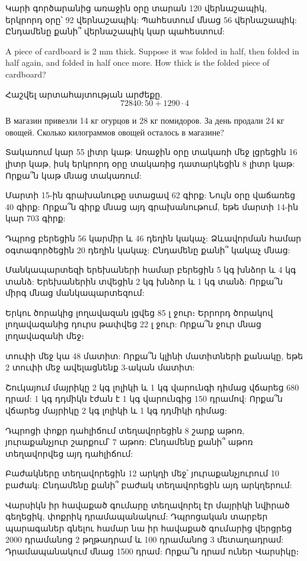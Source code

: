 






\problem 
Կարի գործարանից առաջին օրը տարան 120 վերնաշապիկ, 
երկրորդ օրը՝ 92 վերնաշապիկ: Պահեստում մնաց 56 
վերնաշապիկ: Ընդամենը քանի՞ վերնաշապիկ կար պահեստում:

\problem
A piece of cardboard is 2 mm thick. Suppose it was 
folded in half, then folded in half again, and folded 
in half once more. How thick is the folded piece of 
cardboard?

\problem
Հաշվել արտահայտության արժեքը. $$72840 : 50 + 1290\cdot 4$$

\problem
В магазин привезли 14 кг огурцов и 28 кг помидоров. За день 
продали 24 кг овощей. Сколько килограммов овощей  осталось 
в магазине?

\problem 
Տակառում կար 55 լիտր կաթ: Առաջին օրը տակառի մեջ 
լցրեցին 16 լիտր կաթ, իսկ երկրորդ օրը տակառից 
դատարկեցին 8 լիտր կաթ: Որքա՞ն կաթ մնաց տակառում:

\problem
Մարտի 15-ին գրախանութը ստացավ 62 գիրք: Նույն օրը 
վաճառեց 40 գիրք: Որքա՞ն գիրք մնաց այդ գրախանութում, 
եթե մարտի 14-ին կար 703 գիրք:

\problem 
Դպրոց բերեցին 56 կարմիր և 46 դեղին կակաչ: Ձևավորման 
համար օգտագործեցին 20 դեղին կակաչ: Ընդամենը քանի՞ 
կակաչ մնաց:

\problem
Մանկապարտեզի երեխաների համար բերե\-ցին 5 կգ խնձոր և 4 
կգ տանձ: Երեխաներին տվեցին 2 կգ խնձոր և 1 կգ տանձ: 
Որքա՞ն միրգ մնաց մանկապարտեզում:

\problem 
Երկու ծորակից լողավազան լցվեց 85 լ ջուր։ Երրորդ ծորակով 
լողավազանից դուրս թափ\-վեց 22 լ ջուր: Որքա՞ն ջուր մնաց 
լողավա\-զանի մեջ։

 տուփի մեջ կա 48 մատիտ: Որքա՞ն կլինի մա\-տիտների 
քանակը, եթե 2 տուփի մեջ ավելաց\-նենք 3-ական մատիտ:

\problem 
Շուկայում մայրիկը 2 կգ լոլիկի և 1 կգ վարունգի դիմաց վճարեց 
680 դրամ: 1 կգ դդմիկն էժան է 1 կգ վարունգից 150 դրամով: 
Որքա՞ն վճարեց մայրիկը 2 կգ լոլիկի և 1 կգ դդմիկի դիմաց:

\problem
Դպրոցի փոքր դահլիճում տեղավորեցին 8 շարք աթոռ, յուրաքանչյուր 
շարքում՝ 7 աթոռ: Ընդամենը քանի՞ աթոռ տեղավորվեց այդ դահլիճում:

\problem
Բաժակները տեղավորեցին 12 արկղի մեջ՝ յուրաքանչյուրում 10 
բաժակ: Ընդամենը քանի՞ բաժակ տեղավորեցին այդ արկղերում:

\problem
Վարսիկն իր հավաքած գումարը տեղա\-վորել էր մայրիկի նվիրած 
գեղեցիկ, փոքրիկ դրամա\-պանակում: Դպրոցական տարբեր պա\-րագաներ 
գնելու համար նա իր հավաքած գումարից վերցրեց 2000 դրամանոց 
2 թղթա\-դրամ և 100 դրամանոց 3 մետաղադրամ: Դրամապանակում 
մնաց 1500 դրամ: Որքա՞ն դրամ ուներ Վարսիկը։

